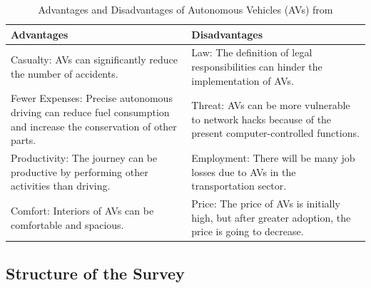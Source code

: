 \begin{table}[ht]
    \centering
    \begin{tabular}{|l|l|}
        \hline
        \textbf{Advantages} & \textbf{Disadvantages} \\ \hline
        Casualty: AVs can significantly reduce the number of accidents. & Law: The definition of legal responsibilities can hinder the implementation of AVs. \\ \hline
        Fewer Expenses: Precise autonomous driving can reduce fuel consumption and increase the conservation of other parts. & Threat: AVs can be more vulnerable to network hacks because of the present computer-controlled functions. \\ \hline
        Productivity: The journey can be productive by performing other activities than driving. & Employment: There will be many job losses due to AVs in the transportation sector. \\ \hline
        Comfort: Interiors of AVs can be comfortable and spacious. & Price: The price of AVs is initially high, but after greater adoption, the price is going to decrease. \\ \hline
    \end{tabular}
    \caption{Advantages and Disadvantages of Autonomous Vehicles (AVs) from \cite{ahangar2021survey} }\label{tab:table}
\end{table}



\subsection{Structure of the Survey}\label{subsec:structure-of-the-survey}
